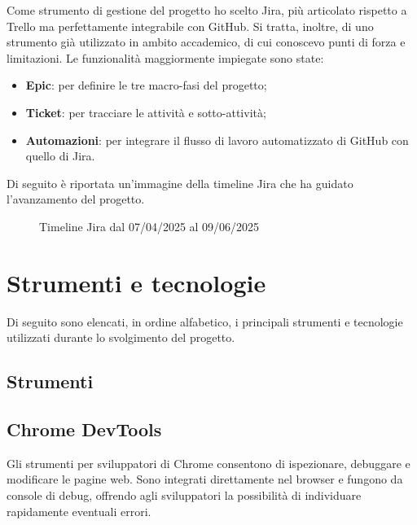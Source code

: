 \vspace{20pt}
\par\noindent Come strumento di gestione del progetto ho scelto Jira, più articolato rispetto a Trello ma perfettamente integrabile con GitHub. Si tratta, inoltre, di uno strumento già utilizzato in ambito accademico, di cui conoscevo punti di forza e limitazioni. Le funzionalità maggiormente impiegate sono state:
\begin{itemize}
  \item \textbf{Epic}: per definire le tre macro-fasi del progetto;
  \item \textbf{Ticket}: per tracciare le attività e sotto-attività;
  \item \textbf{Automazioni}: per integrare il flusso di lavoro automatizzato di GitHub con quello di Jira.
\end{itemize}

\par\noindent Di seguito è riportata un’immagine della timeline Jira che ha guidato l’avanzamento del progetto.

\begin{figure}[H]
  \centering 
  \caption{Timeline Jira dal 07/04/2025 al 09/06/2025}
\end{figure}

\section{Strumenti e tecnologie}
\label{sec:strumenti-tecnologie}

\par Di seguito sono elencati, in ordine alfabetico, i principali strumenti e tecnologie utilizzati durante lo svolgimento del progetto.

\subsection{Strumenti}

\subsection*{Chrome DevTools}

\par Gli strumenti per sviluppatori di Chrome consentono di ispezionare, debuggare e modificare le pagine web. Sono integrati direttamente nel browser e fungono da console di debug, offrendo agli sviluppatori la possibilità di individuare rapidamente eventuali errori.

